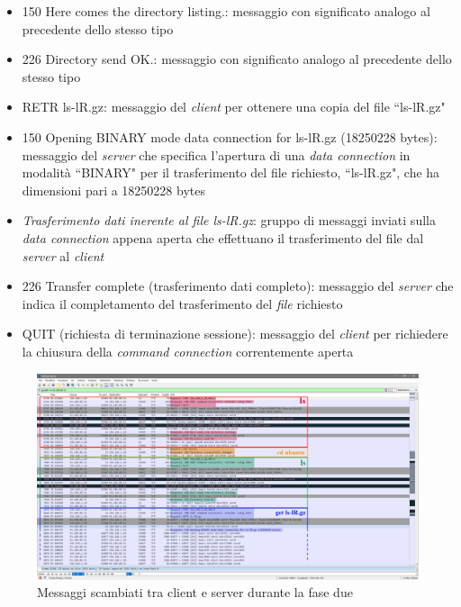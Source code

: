 \documentclass[a4paper, 12pt]{report}
\begin{document}
\begin{enumerate}
\begin{itemize}
	        \item 150 Here comes the directory listing.: messaggio con significato analogo al precedente dello stesso tipo
	        \item 226 Directory send OK.: messaggio con significato analogo al precedente dello stesso tipo
            \item RETR ls-lR.gz: messaggio del \textit{client} per ottenere una copia del file ``ls-lR.gz"
            \item 150 Opening BINARY mode data connection for ls-lR.gz (18250228 bytes): messaggio del \textit{server} che specifica l'apertura di una \textit{data connection}
            in modalità ``BINARY" per il trasferimento del file richiesto, ``ls-lR.gz", che ha dimensioni pari a 18250228 bytes
            \item \textit{Trasferimento dati inerente al file ls-lR.gz}: gruppo di messaggi inviati sulla \textit{data connection} appena aperta che effettuano il
            trasferimento del file dal \textit{server} al \textit{client}
            \item 226 Transfer complete (trasferimento dati completo): messaggio del \textit{server} che indica il completamento del trasferimento del \textit{file} richiesto
            \item QUIT (richiesta di terminazione sessione): messaggio del \textit{client} per richiedere la chiusura della \textit{command connection} correntemente aperta
        \end{itemize}
\end{enumerate}

\begin{figure}[H]
	\centering
	\includegraphics[width=\linewidth]{images/image2_2.png}
	\caption{Messaggi scambiati tra client e server durante la fase due}
\end{figure}
\end{document}
